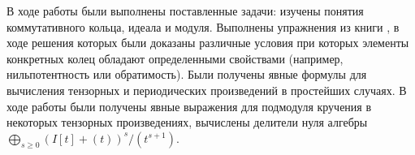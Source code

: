 В ходе работы были выполнены поставленные задачи: изучены понятия коммутативного кольца, идеала и модуля. Выполнены упражнения из
книги \cite{A-M}, в ходе решения которых были доказаны различные условия при которых элементы конкретных колец 
обладают определенными свойствами (например, нильпотентность или обратимость). 
Были получены явные формулы для вычисления тензорных и периодических произведений в простейших случаях.
В ходе работы были получены явные выражения для подмодуля кручения в некоторых тензорных произведениях,
вычислены делители нуля алгебры $\bigoplus_{s \geq 0}{(I[t] + (t))^s / (t^{s + 1})}$.